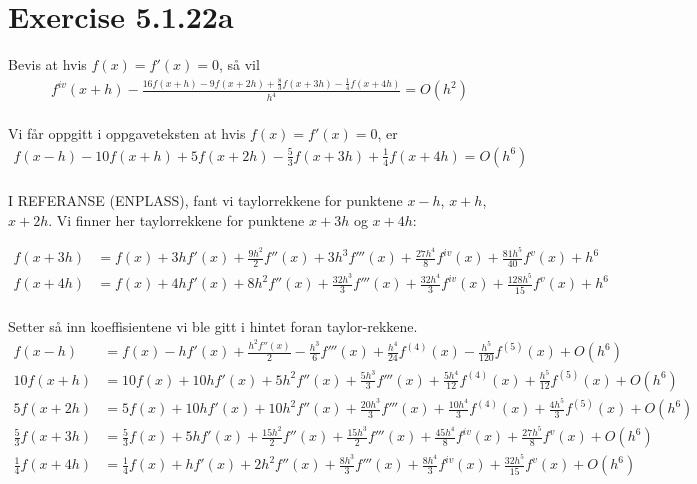  
\section*{Exercise 5.1.22a}
\label{sec:oppgave22a}

Bevis at hvis $f(x) = f'(x) = 0$, så vil 
\begin{multline}
{f^{iv}}(x + h) - \frac{{16f(x + h) - 9f(x + 2h) + \frac{8}{3}f(x + 3h) - \frac{1}{4}f(x + 4h)}}{{{h^4}}} = O({h^2})  
\label{eq22a:oppg} \\
\end{multline}

Vi får oppgitt i oppgaveteksten at hvis $f(x) = f'(x) = 0$, er
\begin{align}
f(x-h)-10f(x+h)+5f(x+2h)-\frac{5}{3}f(x+3h)+\frac{1}{4}f(x+4h)=O(h^6) 
\label{eq22a:hint} \\ \nonumber
\end{align}

I REFERANSE (ENPLASS), fant vi taylorrekkene for punktene $x-h$, $x+h$, $x+2h$. Vi finner her taylorrekkene for punktene $x+3h$ og $x+4h$: %

\begin{align}
f(x+3h) &= f(x) + 3hf'(x) + \frac{{9{h^2}}}{2}f''(x) + 3{h^3}f'''(x) + \frac{{27{h^4}}}{8}{f^{iv}}(x) + \frac{{81{h^5}}}{40}{f^v}(x) + {h^6} \nonumber \\ 
f(x+4h) &= f(x) + 4hf'(x) + 8{h^2}f''(x) + \frac{{32{h^3}}}{3}f'''(x) + \frac{{32{h^4}}}{3}{f^{iv}}(x) + \frac{{128{h^5}}}{{15}}{f^v}(x) + {h^6}\nonumber \\ \nonumber
\end{align}


Setter så inn koeffisientene vi ble gitt i hintet foran taylor-rekkene. 
\begin{align}
 f(x-h)&=f(x)-hf'(x)+\frac{h^2f''(x)}{2}-\frac{h^3}{6}f'''(x)+\frac{h^4}{24}f^{(4)}(x)-\frac{h^5}{120}f^{(5)}(x)+O(h^6)\nonumber \\
10f(x + h) &= 10f(x) + 10hf'(x) + 5{h^2}f''(x) + \frac{{5{h^3}}}{3}f'''(x) + \frac{{5{h^4}}}{{12}}{f^{(4)}}(x) + \frac{{{h^5}}}{{12}}{f^{(5)}}(x) + O(h^6) \nonumber\\
5f(x + 2h) &= 5f(x) + 10hf'(x) + 10{h^2}f''(x) + \frac{{20{h^3}}}{3}f'''(x) + \frac{{10{h^4}}}{3}{f^{(4)}}(x) + \frac{{4{h^5}}}{3}{f^{(5)}}(x) + O(h^6) \nonumber \\
\frac{5}{3}f(x + 3h) &= \frac{5}{3}f(x) + 5hf'(x) + \frac{{15{h^2}}}{2}f''(x) + \frac{15h^3}{2}f'''(x) + \frac{{45{h^4}}}{8}{f^{iv}}(x) + \frac{{27{h^5}}}{8}{f^v}(x) + O(h^6) \nonumber \\ 
\frac{1}{4}f(x + 4h) &= \frac{1}{4}f(x) + hf'(x) + 2{h^2}f''(x) + \frac{{8{h^3}}}{3}f'''(x) + \frac{{8{h^4}}}{3}{f^{iv}}(x) + \frac{{32{h^5}}}{{15}}{f^v}(x) + O(h^6) \nonumber 
\end{align}
\newpage


